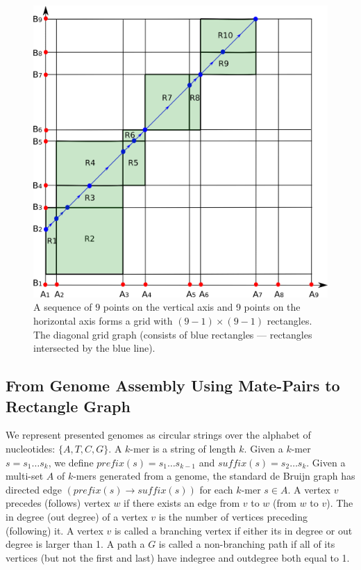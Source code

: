 \documentclass[a4paper]{article}
\begin{document}
\begin{figure}
\includegraphics[scale=0.3]{fig/gridGraph.eps}
\caption{A sequence of $9$ points on the vertical axis and 9 points on the horizontal axis forms a grid with $(9-1) \times (9-1)$ rectangles.
The diagonal grid graph (consists of blue rectangles --- rectangles intersected by the blue line). }
\end{figure}


\subsection{From Genome Assembly Using Mate-Pairs to Rectangle Graph}

We represent presented genomes as circular strings over the alphabet of nucleotides: $\{A,T,C,G\}$. 
A $k$-mer is a string of length $k$.
Given a $k$-mer $s = s_1\ldots s_k$,
we define $prefix(s)= s_1\ldots s_{k-1}$ and $suffix(s) = s_2\ldots s_k$. Given a multi-set $A$ of $k$-mers generated from a genome, 
the standard de Bruijn graph has directed edge $(prefix(s) \rightarrow suffix(s))$
for each $k$-mer $s\in A$.  A vertex $v$  precedes (follows) vertex $w$ if there exists an edge from $v$ to $w$ (from $w$ to $v$). The in degree (out degree)  of a vertex 
$v$ is the number of vertices preceding (following) it.  A vertex $v$ is called a branching vertex if either its in degree or out degree is larger than 1. A path a $G$ is called a non-branching path if all of its vertices (but not the first and last) have indegree and outdegree
both equal to 1. %
\end{document}
